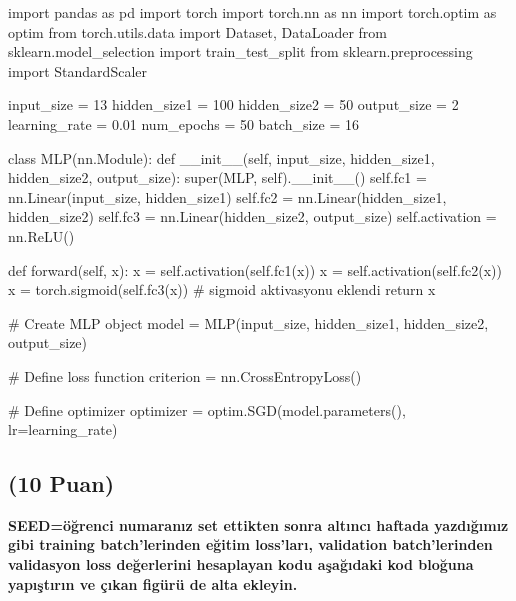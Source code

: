 \documentclass[11pt]{article}
\begin{document}
\begin{python}
import pandas as pd
import torch
import torch.nn as nn
import torch.optim as optim
from torch.utils.data import Dataset, DataLoader
from sklearn.model_selection import train_test_split
from sklearn.preprocessing import StandardScaler


input_size = 13
hidden_size1 = 100
hidden_size2 = 50
output_size = 2
learning_rate = 0.01
num_epochs = 50
batch_size = 16

class MLP(nn.Module):
    def __init__(self, input_size, hidden_size1, hidden_size2, output_size):
        super(MLP, self).__init__()
        self.fc1 = nn.Linear(input_size, hidden_size1)
        self.fc2 = nn.Linear(hidden_size1, hidden_size2)
        self.fc3 = nn.Linear(hidden_size2, output_size)
        self.activation = nn.ReLU()

    def forward(self, x):
        x = self.activation(self.fc1(x))
        x = self.activation(self.fc2(x))
        x = torch.sigmoid(self.fc3(x))  # sigmoid aktivasyonu eklendi
        return x

# Create MLP object
model = MLP(input_size, hidden_size1, hidden_size2, output_size)

# Define loss function
criterion = nn.CrossEntropyLoss()

# Define optimizer
optimizer = optim.SGD(model.parameters(), lr=learning_rate)

\end{python}

\subsection{(10 Puan)} \textbf{SEED=öğrenci numaranız set ettikten sonra altıncı haftada yazdığımız gibi training batch'lerinden eğitim loss'ları, validation batch'lerinden validasyon loss değerlerini hesaplayan kodu aşağıdaki kod bloğuna yapıştırın ve çıkan figürü de alta ekleyin.}
\end{document}
